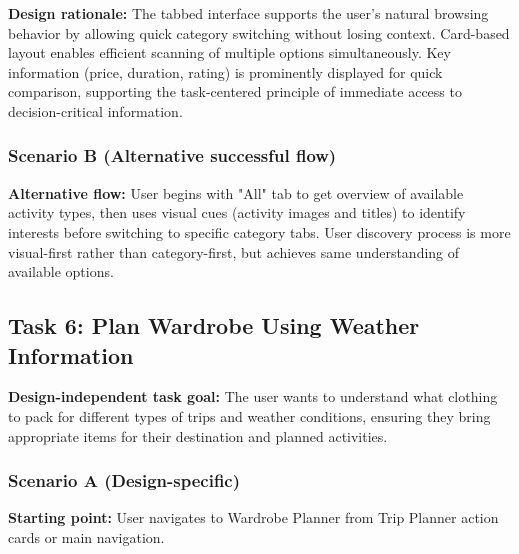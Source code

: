 \documentclass[11pt,a4paper]{article}
\begin{document}
\textbf{Design rationale:} The tabbed interface supports the user's natural browsing behavior by allowing quick category switching without losing context. Card-based layout enables efficient scanning of multiple options simultaneously. Key information (price, duration, rating) is prominently displayed for quick comparison, supporting the task-centered principle of immediate access to decision-critical information.

\subsubsection*{Scenario B (Alternative successful flow)}

\textbf{Alternative flow:} User begins with "All" tab to get overview of available activity types, then uses visual cues (activity images and titles) to identify interests before switching to specific category tabs. User discovery process is more visual-first rather than category-first, but achieves same understanding of available options.

\subsection*{Task 6: Plan Wardrobe Using Weather Information}

\textbf{Design-independent task goal:}
The user wants to understand what clothing to pack for different types of trips and weather conditions, ensuring they bring appropriate items for their destination and planned activities.

\subsubsection*{Scenario A (Design-specific)}

\textbf{Starting point:} User navigates to Wardrobe Planner from Trip Planner action cards or main navigation.
\end{document}
